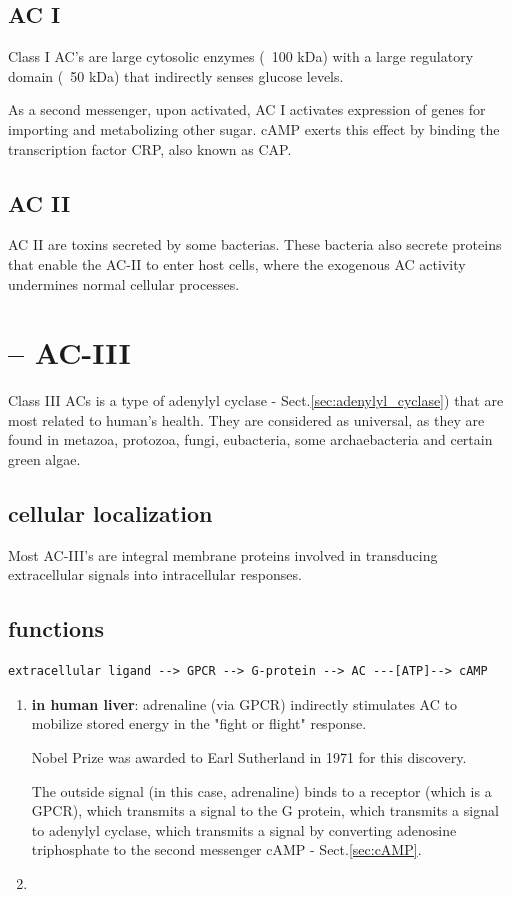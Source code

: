 \subsection{AC I}

Class I AC's are large cytosolic enzymes (~100 kDa) with a large regulatory
domain (~50 kDa) that indirectly senses glucose levels.

As a second messenger, upon activated, AC I activates expression of genes for
importing and metabolizing other sugar. cAMP exerts this effect by binding the
transcription factor CRP, also known as CAP.

\subsection{AC II}

AC II are toxins secreted by some bacterias.
These bacteria also secrete proteins that enable the AC-II to enter host cells,
where the exogenous AC activity undermines normal cellular processes.



\section{--  AC-III}

Class III ACs is a type of adenylyl cyclase - Sect.\ref{sec:adenylyl_cyclase})
that are most related to human's health. They are considered as universal, as
they are found in metazoa, protozoa, fungi, eubacteria, some archaebacteria and
certain green algae.


\subsection{cellular localization}

Most AC-III's are integral membrane proteins involved in transducing
extracellular signals into intracellular responses.


\subsection{functions}

\begin{verbatim}
extracellular ligand --> GPCR --> G-protein --> AC ---[ATP]--> cAMP 
\end{verbatim}

\begin{enumerate}
  \item {\bf in human liver}: adrenaline (via GPCR) indirectly stimulates AC to
  mobilize stored energy in the "fight or flight" response. 
  
  Nobel Prize was awarded to Earl Sutherland in 1971 for this discovery.
  
  The outside signal (in this case, adrenaline) binds to a receptor (which is a
  GPCR), which transmits a signal to the G protein, which transmits a signal to
  adenylyl cyclase, which transmits a signal by converting adenosine triphosphate to
  the second messenger cAMP - Sect.\ref{sec:cAMP}.
  
  \item 
\end{enumerate}

